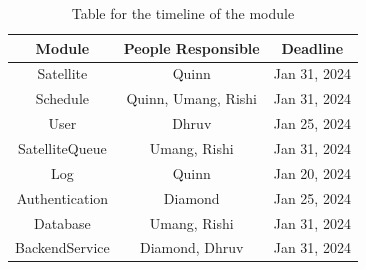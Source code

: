 \documentclass[12pt, titlepage]{article}
\begin{document}
\begin{table}
    \centering
    \begin{tabular}{|c|c|c|} \hline 
         \textbf{Module}&  \textbf{People Responsible}& \textbf{Deadline}\\ \hline 
         Satellite&  Quinn& Jan 31, 2024\\ \hline 
         Schedule&  Quinn, Umang, Rishi& Jan 31, 2024\\ \hline 
         User&  Dhruv& Jan 25, 2024\\ \hline 
         SatelliteQueue&  Umang, Rishi& Jan 31, 2024\\ \hline 
         Log&  Quinn& Jan 20, 2024\\ \hline 
         Authentication&  Diamond& Jan 25, 2024\\ \hline 
         Database&  Umang, Rishi& Jan 31, 2024\\ \hline 
         BackendService&  Diamond, Dhruv& Jan 31, 2024\\ \hline
    \end{tabular}
    \caption{Table for the timeline of the module}
    \label{tab:my_label}
\end{table}
\end{document}
